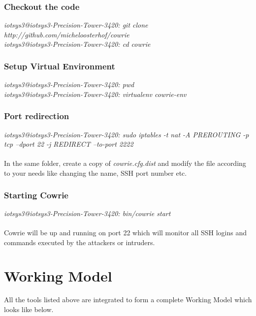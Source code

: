 \documentclass{report}
\begin{document}
\subsubsection{Checkout the code } 
\textit{{\color{blue}iotsys3@iotsys3-Precision-Tower-3420:} git clone http://github.com/micheloosterhof/cowrie}\\
\textit{{\color{blue}iotsys3@iotsys3-Precision-Tower-3420:} cd cowrie}


\subsubsection{Setup Virtual Environment } 
\textit{{\color{blue}iotsys3@iotsys3-Precision-Tower-3420:} pwd}\\
\textit{{\color{blue}iotsys3@iotsys3-Precision-Tower-3420:} virtualenv cowrie-env}

\subsubsection{Port redirection } 
\textit{{\color{blue}iotsys3@iotsys3-Precision-Tower-3420:} sudo iptables -t nat -A PREROUTING -p tcp --dport 22 -j REDIRECT --to-port 2222}

\paragraph{}
In the same folder, create a copy of \textit{cowrie.cfg.dist} and modify the file according to your needs like changing the name, SSH port number etc. 

\subsubsection{Starting Cowrie }
\textit{{\color{blue}iotsys3@iotsys3-Precision-Tower-3420:} bin/cowrie start}

\paragraph{}
Cowrie will be up and running on port 22 which will monitor all SSH logins and commands executed by the attackers or intruders.


\section{Working Model}

All the tools listed above are integrated to form a complete Working Model which looks like below.
\end{document}
